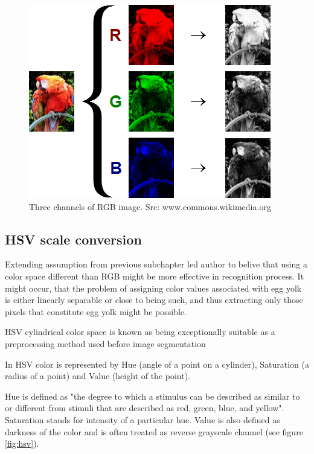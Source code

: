 \documentclass[12pt,twoside,a4paper]{article}
\begin{document}
\begin{figure}[H]
\centering
\includegraphics[width=0.4\paperwidth]{rgb}
\caption{Three channels of RGB image. Src: www.commons.wikimedia.org}\label{fig:rgb}
\end{figure}


\subsection{HSV scale conversion}

Extending assumption from previous subchapter led author to belive that using a color space different than RGB might be more effective in recognition process.
It might occur, that the problem of assigning color values associated with egg yolk is either linearly separable or close to being such, and thus extracting only those pixels that constitute egg yolk might be possible.

HSV cylindrical color space is known as being exceptionally suitable as a preprocessing method used before image segmentation \cite{hsv}

In HSV color is represented by Hue (angle of a point on a cylinder), Saturation (a radius of a point) and Value (height of the point).

Hue is defined as "the degree to which a stimulus can be described as similar to or different from stimuli that are described as red, green, blue, and yellow"\cite{hue}.
Saturation stands for intensity of a particular hue.
Value is also defined as darkness of the color and is often treated as reverse grayscale channel (see figure \ref{fig:hsv}).
\end{document}
